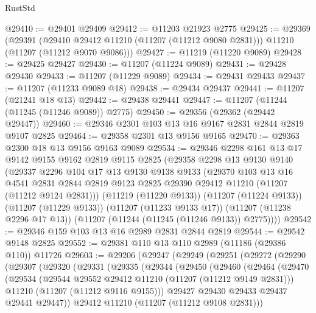 \begin{lexlean}{RustStd}
\begin{coremodule}
@29410 := @29401 @29409
@29412 := @11203 @21923 @2775
@29425 := @29369
    (@29391
      (@29410 @29412 @11210 (@11207 (@11212 @9080 @2831)))
      @11210
      (@11207 (@11212 @9070 @9086)))
@29427 := @11219 (@11220 @9089)
@29428 := @29425 @29427
@29430 := @11207 (@11224 @9089)
@29431 := @29428 @29430
@29433 := @11207 (@11229 @9089)
@29434 := @29431 @29433
@29437 := @11207 (@11233 @9089 @18)
@29438 := @29434 @29437
@29441 := @11207 (@21241 @18 @13)
@29442 := @29438 @29441
@29447 := @11207 (@11244 (@11245 (@11246 @9089)) @2775)
@29450 := @29356 (@29362 (@29442 @29447))
@29460 := @29346 @2301 @103 @13 @16 @9167 @2831 @2844 @2819 @9107 @2825
@29464 := @29358 @2301 @13 @9156 @9165
@29470 := @29363 @2300 @18 @13 @9156 @9163 @9089
@29534 := @29346
    @2298
    @161
    @13
    @17
    @9142
    @9155
    @9162
    @2819
    @9115
    @2825
    (@29358
      @2298
      @13
      @9130
      @9140
      (@29337
        @2296
        @104
        @17
        @13
        @9130
        @9138
        @9133
        (@29370
          @103
          @13
          @16
          @4541
          @2831
          @2844
          @2819
          @9123
          @2825
          @29390
          @29412
          @11210
          (@11207 (@11212 @9124 @2831)))
        (@11219 (@11220 @9133))
        (@11207 (@11224 @9133))
        (@11207 (@11229 @9133))
        (@11207 (@11233 @9133 @17))
        (@11207 (@11238 @2296 @17 @13))
        (@11207 (@11244 (@11245 (@11246 @9133)) @2775))))
@29542 := @29346 @159 @103 @13 @16 @2989 @2831 @2844 @2819
@29544 := @29542 @9148 @2825
@29552 := @29381 @110 @13 @110 @2989 (@11186 (@29386 @110)) @11726
@29603 := @29206
    (@29247
      (@29249
        (@29251
          (@29272
            (@29290
              (@29307
                (@29320
                  (@29331
                    (@29335
                      (@29344
                        (@29450
                          (@29460
                            (@29464
                              (@29470
                                (@29534
                                  (@29544 @29552 @29412 @11210 (@11207 (@11212 @9149 @2831)))
                                  @11210
                                  (@11207 (@11212 @9116 @9155)))
                                @29427
                                @29430
                                @29433
                                @29437
                                @29441
                                @29447))
                            @29412
                            @11210
                            (@11207 (@11212 @9108 @2831)))

\end{coremodule}
\end{lexlean}
